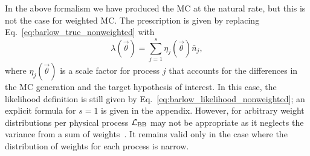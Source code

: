 \documentclass[a4paper, 11pt]{article}
\newcommand{\like}{\mathcal{L}}
\newcommand{\vectheta}{\vec{\theta}}
\newcommand{\lbarlow}{\like_{\textmd{BB}}}
\begin{document}
In the above formalism we have produced the MC at the natural rate, but this is not the case for weighted MC. The prescription is given by replacing Eq.~\eqref{eq:barlow_true_nonweighted} with
\begin{equation}
\lambda(\vectheta) = \sum_{j=1}^s \eta_{j}(\vectheta) \bar n_j,
\label{eq:barlow_true_weighted}
\end{equation}
where $\eta_{j}(\vectheta)$ is a scale factor for process $j$ that accounts for the differences in the MC generation and the target hypothesis of interest. In this case, the likelihood definition is still given by Eq.~\eqref{eq:barlow_likelihood_nonweighted}; an explicit formula for $s=1$ is given in the appendix. However, for arbitrary weight distributions per physical process $\lbarlow$ may not be appropriate as it neglects the variance from a sum of weights~\cite{Barlow:1993dm}. It remains valid only in the case where the distribution of weights for each process is narrow.
\end{document}
